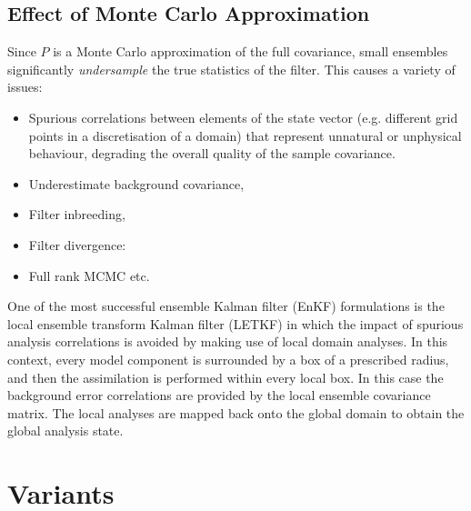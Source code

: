 

\begin{remark}
\end{remark}

\subsection{Effect of Monte Carlo Approximation}


Since $P$ is a Monte Carlo approximation of the full covariance, small ensembles significantly
\emph{undersample} the true statistics of the filter. This causes a variety of issues:
\begin{itemize}
    \item Spurious correlations between elements of the state vector (e.g. different
    grid points in a discretisation of a domain) that represent unnatural or unphysical behaviour,
    degrading the overall quality of the sample covariance.
    \item Underestimate background covariance,
    \item Filter inbreeding,
    \item Filter divergence:
    \item Full rank MCMC etc.
\end{itemize}

One of the most successful ensemble Kalman filter (EnKF) formulations is the local
ensemble transform Kalman filter (LETKF) in which the impact of spurious analysis
correlations is avoided by making use of local domain analyses. In this context, every
model component is surrounded by a box of a prescribed radius, and then the
assimilation is performed within every local box. In this case the background error
correlations are provided by the local ensemble covariance matrix. The local analyses
are mapped back onto the global domain to obtain the global analysis state.

\section{Variants}

